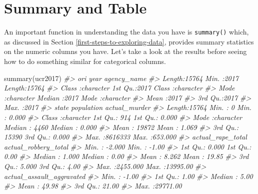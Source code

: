 \documentclass[
  12pt,
  openany]{book}
\newenvironment{Shaded}{\begin{snugshade}}{\end{snugshade}}
\newcommand{\CommentTok}[1]{\textcolor[rgb]{0.37,0.37,0.37}{\textit{#1}}}
\newcommand{\FunctionTok}[1]{\textcolor[rgb]{0,0,0}{#1}}
\newcommand{\NormalTok}[1]{#1}
\begin{document}
\hypertarget{summary-and-table}{%
\section{Summary and Table}\label{summary-and-table}}

An important function in understanding the data you have is \texttt{summary()} which, as discussed in Section \ref{first-steps-to-exploring-data}, provides summary statistics on the numeric columns you have. Let's take a look at the results before seeing how to do something similar for categorical columns.

\begin{Shaded}
\begin{Highlighting}[]
\FunctionTok{summary}\NormalTok{(ucr2017)}
\CommentTok{\#\textgreater{}      ori                 year      agency\_name       }
\CommentTok{\#\textgreater{}  Length:15764       Min.   :2017   Length:15764      }
\CommentTok{\#\textgreater{}  Class :character   1st Qu.:2017   Class :character  }
\CommentTok{\#\textgreater{}  Mode  :character   Median :2017   Mode  :character  }
\CommentTok{\#\textgreater{}                     Mean   :2017                     }
\CommentTok{\#\textgreater{}                     3rd Qu.:2017                     }
\CommentTok{\#\textgreater{}                     Max.   :2017                     }
\CommentTok{\#\textgreater{}     state             population      actual\_murder    }
\CommentTok{\#\textgreater{}  Length:15764       Min.   :      0   Min.   :  0.000  }
\CommentTok{\#\textgreater{}  Class :character   1st Qu.:    914   1st Qu.:  0.000  }
\CommentTok{\#\textgreater{}  Mode  :character   Median :   4460   Median :  0.000  }
\CommentTok{\#\textgreater{}                     Mean   :  19872   Mean   :  1.069  }
\CommentTok{\#\textgreater{}                     3rd Qu.:  15390   3rd Qu.:  0.000  }
\CommentTok{\#\textgreater{}                     Max.   :8616333   Max.   :653.000  }
\CommentTok{\#\textgreater{}  actual\_rape\_total  actual\_robbery\_total}
\CommentTok{\#\textgreater{}  Min.   :  {-}2.000   Min.   :   {-}1.00    }
\CommentTok{\#\textgreater{}  1st Qu.:   0.000   1st Qu.:    0.00    }
\CommentTok{\#\textgreater{}  Median :   1.000   Median :    0.00    }
\CommentTok{\#\textgreater{}  Mean   :   8.262   Mean   :   19.85    }
\CommentTok{\#\textgreater{}  3rd Qu.:   5.000   3rd Qu.:    4.00    }
\CommentTok{\#\textgreater{}  Max.   :2455.000   Max.   :13995.00    }
\CommentTok{\#\textgreater{}  actual\_assault\_aggravated}
\CommentTok{\#\textgreater{}  Min.   :   {-}1.00         }
\CommentTok{\#\textgreater{}  1st Qu.:    1.00         }
\CommentTok{\#\textgreater{}  Median :    5.00         }
\CommentTok{\#\textgreater{}  Mean   :   49.98         }
\CommentTok{\#\textgreater{}  3rd Qu.:   21.00         }
\CommentTok{\#\textgreater{}  Max.   :29771.00}
\end{Highlighting}
\end{Shaded}
\end{document}
